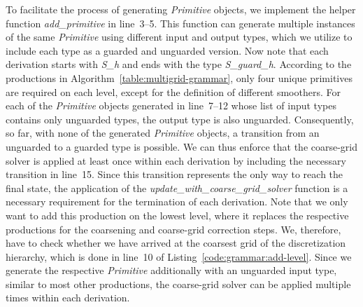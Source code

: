To facilitate the process of generating  \emph{Primitive} objects, we implement the helper function \emph{add\_primitive} in line~3--5.
This function can generate multiple instances of the same \emph{Primitive} using different input and output types, which we utilize to include each type as a guarded and unguarded version.
Now note that each derivation starts with \emph{S\_h} and ends with the type \emph{S\_guard\_h}.
According to the productions in Algorithm~\ref{table:multigrid-grammar}, only four unique primitives are required on each level, except for the definition of different smoothers.
For each of the \emph{Primitive} objects generated in line~7--12 whose list of input types contains only unguarded types, the output type is also unguarded.
Consequently, so far, with none of the generated \emph{Primitive} objects, a transition from an unguarded to a guarded type is possible.
We can thus enforce that the coarse-grid solver is applied at least once within each derivation by including the necessary transition in line~15.
Since this transition represents the only way to reach the final state, the application of the \emph{update\_with\_coarse\_grid\_solver} function is a necessary requirement for the termination of each derivation.
Note that we only want to add this production on the lowest level, where it replaces the respective productions for the coarsening and coarse-grid correction steps.
We, therefore, have to check whether we have arrived at the coarsest grid of the discretization hierarchy, which is done in line~10 of Listing~\ref{code:grammar:add-level}.
Since we generate the respective \emph{Primitive} additionally with an unguarded input type, similar to most other productions, the coarse-grid solver can be applied multiple times within each derivation.


